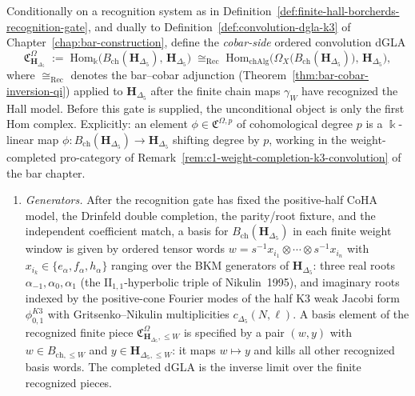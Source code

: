 \begin{definition}
\label{def:cobar-convolution-dgla-k3}
Conditionally on a recognition system as in
Definition~\ref{def:finite-hall-borcherds-recognition-gate}, and
dually to Definition~\ref{def:convolution-dgla-k3} of
Chapter~\ref{chap:bar-construction}, define the \emph{cobar-side}
ordered convolution dGLA
\[
 \mathfrak{C}^\Omega_{\mathbf{H}_{\Delta_5}}
 \;:=\;
 \mathrm{Hom}_{\Bbbk}\!\bigl(B_{\mathrm{ch}}(\mathbf{H}_{\Delta_5}),\,
 \mathbf{H}_{\Delta_5}\bigr)
 \;\cong_{\mathrm{Rec}}\;
 \mathrm{Hom}_{\mathrm{chAlg}}\!\bigl(
 \Omega_X\bigl(B_{\mathrm{ch}}(\mathbf{H}_{\Delta_5})\bigr),\,
 \mathbf{H}_{\Delta_5}\bigr),
\]
where $\cong_{\mathrm{Rec}}$ denotes the bar--cobar adjunction
(Theorem~\ref{thm:bar-cobar-inversion-qi}) applied to
$\mathbf{H}_{\Delta_5}$ after the finite chain maps $\gamma_W$ have
recognized the Hall model. Before this gate is supplied, the
unconditional object is only the first Hom complex. Explicitly: an
element
$\phi\in\mathfrak{C}^{\Omega,p}$ of cohomological degree $p$ is a
$\Bbbk$-linear map
$\phi\colon B_{\mathrm{ch}}(\mathbf{H}_{\Delta_5})\to
\mathbf{H}_{\Delta_5}$
shifting degree by $p$, working in the weight-completed pro-category
of Remark~\ref{rem:c1-weight-completion-k3-convolution} of the bar
chapter.
\begin{enumerate}[label=\textup{(\alph*)}]
\item \emph{Generators.} After the recognition gate has fixed the
positive-half CoHA model, the Drinfeld double completion, the
parity/root fixture, and the independent coefficient match, a basis for
$B_{\mathrm{ch}}(\mathbf{H}_{\Delta_5})$ in each finite weight window
is given by ordered tensor words
$w = s^{-1}x_{i_1}\otimes\cdots\otimes s^{-1}x_{i_n}$
with $x_{i_k}\in\{e_\alpha, f_\alpha, h_\alpha\}$ ranging over the
BKM generators of $\mathbf{H}_{\Delta_5}$: three real roots $\alpha_{-1},
\alpha_0, \alpha_1$ (the $\mathrm{II}_{1,1}$-hyperbolic triple of
Nikulin~1995), and imaginary roots indexed by the positive-cone
Fourier modes of the half K3 weak Jacobi form $\phi_{0,1}^{K3}$ with
Gritsenko--Nikulin multiplicities $c_{\Delta_5}(N,\ell)$. A basis
element of the recognized finite piece
$\mathfrak{C}^{\Omega}_{\mathbf{H}_{\Delta_5},\le W}$ is specified by a
pair $(w, y)$ with $w\in B_{\mathrm{ch},\le W}$ and
$y\in\mathbf{H}_{\Delta_5,\le W}$: it maps $w\mapsto y$ and kills all
other recognized basis words. The completed dGLA is the inverse limit
over the finite recognized pieces.

\end{enumerate}
\end{definition}
